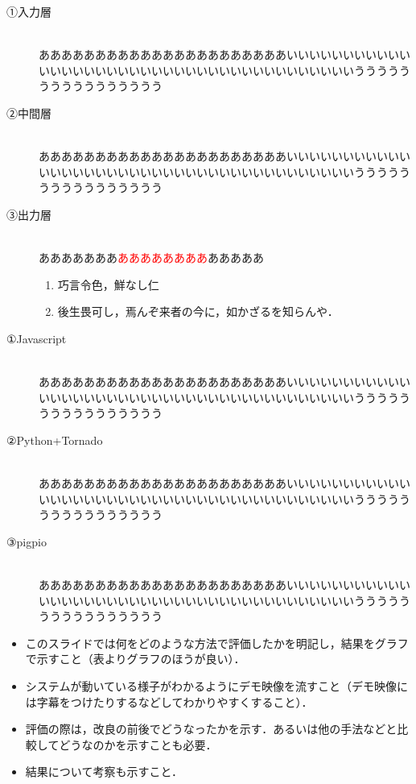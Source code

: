 \begin{description}
	\item[①入力層]~\\
	ああああああああああああああああああああああいいいいいいいいいいいいいいいいいいいいいいいいいいいいいいいいいいいいいいいうううううううううううううううう
	\item[②中間層]~\\
	ああああああああああああああああああああああいいいいいいいいいいいいいいいいいいいいいいいいいいいいいいいいいいいいいいいうううううううううううううううう
	\item[③出力層]~\\
	あああああああ\textcolor{red}{ああああああああ}あああああ
	\begin{enumerate}
		\item 巧言令色，鮮なし仁
		\item 後生畏可し，焉んぞ来者の今に，如かざるを知らんや．
	\end{enumerate}
\end{description}
\newpage

\begin{description} 
	\item[①Javascript]~\\
	ああああああああああああああああああああああいいいいいいいいいいいいいいいいいいいいいいいいいいいいいいいいいいいいいいいうううううううううううううううう
	\item[②Python+Tornado]~\\
	ああああああああああああああああああああああいいいいいいいいいいいいいいいいいいいいいいいいいいいいいいいいいいいいいいいうううううううううううううううう
	\item[③pigpio]~\\
	ああああああああああああああああああああああいいいいいいいいいいいいいいいいいいいいいいいいいいいいいいいいいいいいいいいうううううううううううううううう
\end{description}
\newpage


\begin{itemize}
	\item このスライドでは何をどのような方法で評価したかを明記し，結果をグラフで示すこと（表よりグラフのほうが良い）．
	\item システムが動いている様子がわかるようにデモ映像を流すこと（デモ映像には字幕をつけたりするなどしてわかりやすくすること）．
	\item 評価の際は，改良の前後でどうなったかを示す．あるいは他の手法などと比較してどうなのかを示すことも必要．
	\item 結果について考察も示すこと．
\end{itemize}
\newpage

